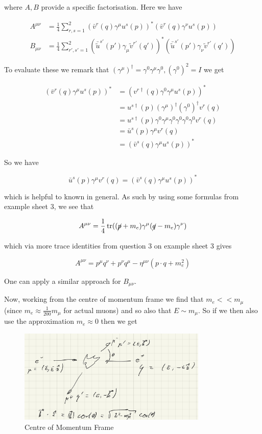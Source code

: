 \documentclass{article}
\theoremstyle{definition}
\begin{document}
where $A, B$ provide a specific factorisation. Here we have

\begin{align*}
A^{\mu \nu} &= \frac{1}{4} \sum_{r, s=1}^2 (\bar{v}^r(q) \gamma^\mu u^s(p))^* 
(\bar{v}^r(q)\gamma^\nu u^s(p)) \\
B_{\mu \nu} &= \frac{1}{4} \sum_{r',s'=1}^2 
(\bar{\tilde{u}}^{s'}(p') \gamma_\mu \tilde{v}^{r'}(q'))^* 
(\bar{\tilde{u}}^{s'}(p') \gamma_\nu \tilde{v}^{r'}(q'))
\end{align*}

To evaluate these we remark that $(\gamma^\mu)^\dagger = \gamma^0 \gamma^\mu
\gamma^0, (\gamma^0)^2 = I$ we get

\begin{align*}
(\bar{v}^r(q) \gamma^\mu u^s(p))^* 
&= (v^{r \dagger}(q) \gamma^0 \gamma^\mu u^s(p))^* \\
&= u^{s \dagger}(p) (\gamma^\mu)^\dagger (\gamma^0)^\dagger v^r(q) \\
&= u^{s \dagger}(p) \gamma^0 \gamma^\mu \gamma^0 \gamma^0 \gamma^0 \gamma^0 v^r(q) \\
&= \bar{u}^s(p) \gamma^\mu v^r(q) \\
&= (\bar{v}^s(q) \gamma^\mu u^s(p))^*
\end{align*}

So we have

$$ \bar{u}^s(p) \gamma^\mu v^r(q) = (\bar{v}^s(q) \gamma^\mu u^s(p))^* $$

which is helpful to known in general. As such by using some formulas from
example sheet 3, we see that

$$ A^{\mu \nu} = \frac{1}{4} \tr( (\cancel{p} + m_e) \gamma^\mu (\cancel{q} -
m_e) \gamma^\nu) $$

which via more trace identities from question 3 on example sheet 3 gives

$$ A^{\mu \nu} = p^\mu q^\nu + p^\nu q^\mu - \eta^{\mu \nu} (p \cdot q +
m_e^2) $$

One can apply a similar approach for $B_{\mu \nu}$. 

Now, working from the centre of momentum frame we find that $m_e << m_\mu$
(since $m_e \approx \frac{1}{200} m_\mu$ for actual muons) and so also that $E
\sim m_\mu$. So if we then also use the approximation $m_e \approx 0$ then we
get

\begin{figure}[H]
\centering
\includegraphics[width=9cm]{res/QFT/electron_muon_scattering}
\caption{Centre of Momentum Frame}
\label{electron_muon_scattering}
\end{figure}
\end{document}
